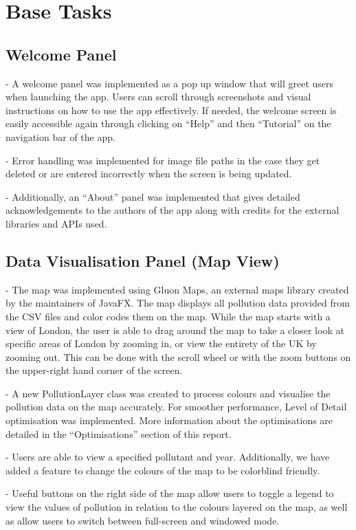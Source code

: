 \documentclass[../main.tex]{subfiles}
\begin{document}
\section{Base Tasks}

\subsection{Welcome Panel}
    - A welcome panel was implemented as a pop up window that will greet users when launching the app. Users can scroll through screenshots and visual instructions on how to use the app effectively. If needed, the welcome screen is easily accessible again through clicking on “Help” and then “Tutorial” on the navigation bar of the app.
    
    - Error handling was implemented for image file paths in the case they get deleted or are entered incorrectly when the screen is being updated.
    
    - Additionally, an “About” panel was implemented that gives detailed acknowledgements to the authors of the app along with credits for the external libraries and APIs used.
    
\subsection{Data Visualisation Panel (Map View)}
    - The map was implemented using Gluon Maps, an external maps library created by the maintainers of JavaFX. The map displays all pollution data provided from the CSV files and color codes them on the map. While the map starts with a view of London, the user is able to drag around the map to take a closer look at specific areas of London by zooming in, or view the entirety of the UK by zooming out. This can be done with the scroll wheel or with the zoom buttons on the upper-right hand corner of the screen.
    
    - A new PollutionLayer class was created to process colours and visualise the pollution data on the map accurately. For smoother performance, Level of Detail optimisation was implemented. More information about the optimisations are detailed in the “Optimisations” section of this report.
    
    - Users are able to view a specified pollutant and year. Additionally, we have added a feature to change the colours of the map to be colorblind friendly.
    
    - Useful buttons on the right side of the map allow users to toggle a legend to view the values of pollution in relation to the colours layered on the map, as well as allow users to switch between full-screen and windowed mode.
    
\end{document}
